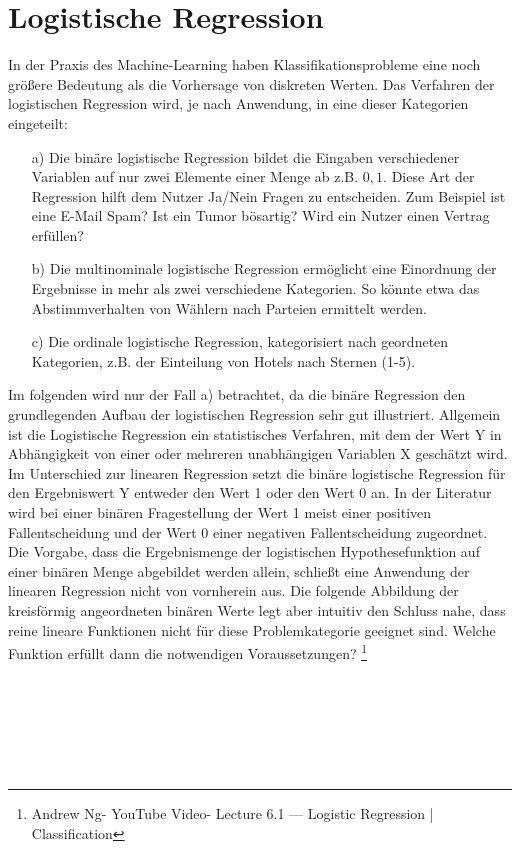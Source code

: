 \documentclass[a4paper]{scrreprt}
\begin{document}
\section{Logistische Regression}
In der Praxis des Machine-Learning haben Klassifikationsprobleme eine noch größere Bedeutung als die Vorhersage von diskreten Werten. Das Verfahren der logistischen Regression wird, je nach Anwendung, in eine dieser Kategorien eingeteilt:\\
\begin{enumerate}
\item [a)]
Die binäre logistische Regression bildet die Eingaben verschiedener Variablen auf nur zwei Elemente einer Menge ab z.B. ${0,1}$. Diese Art der Regression hilft dem Nutzer Ja/Nein Fragen zu entscheiden. Zum Beispiel ist eine E-Mail Spam? Ist ein Tumor bösartig? Wird ein Nutzer einen Vertrag erfüllen?
\item [b)]
Die multinominale logistische Regression ermöglicht eine Einordnung der Ergebnisse in mehr als zwei verschiedene Kategorien. So könnte etwa das Abstimmverhalten von Wählern nach Parteien ermittelt werden.
\item [c)]
Die ordinale logistische Regression, kategorisiert nach geordneten Kategorien, z.B. der Einteilung von Hotels nach Sternen (1-5).
\end{enumerate}
Im folgenden wird nur der Fall a) betrachtet, da die binäre Regression den grundlegenden Aufbau der logistischen Regression sehr gut illustriert. Allgemein ist die Logistische Regression ein statistisches Verfahren, mit dem der Wert Y in Abhängigkeit von einer oder mehreren unabhängigen Variablen X geschätzt wird. Im Unterschied zur linearen Regression setzt die binäre logistische Regression für den Ergebniswert Y entweder den Wert 1 oder den Wert 0 an. In der Literatur wird bei einer binären Fragestellung der Wert 1 meist einer positiven Fallentscheidung und der Wert 0 einer negativen Fallentscheidung zugeordnet. Die Vorgabe, dass die Ergebnismenge der logistischen Hypothesefunktion auf einer binären Menge abgebildet werden allein, schließt eine Anwendung der linearen Regression nicht von vornherein aus. Die folgende Abbildung der kreisförmig angeordneten binären Werte legt aber intuitiv den Schluss nahe, dass reine lineare Funktionen nicht für diese Problemkategorie geeignet sind. Welche Funktion erfüllt dann die notwendigen Voraussetzungen?
\footnote{Andrew Ng- YouTube Video- Lecture 6.1 — Logistic Regression | Classification}
\par\bigskip
\\\\\
\\\\\
\end{document}
